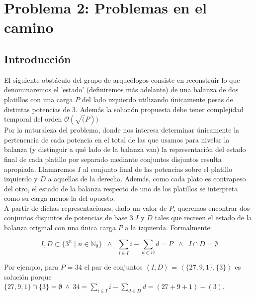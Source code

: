 \newpage
\section{Problema 2: Problemas en el camino}

\subsection{Introducción}
	El siguiente obstáculo del grupo de arqueólogos consiste en reconstruir lo que denominaremos el 'estado' (definiremos más adelante) de una balanza de dos platillos con una carga $P$ del lado izquierdo utilizando únicamente pesas de distintas potencias de 3. Además la solución propuesta debe tener complejidad temporal del orden $\mathcal{O}(\sqrt(P))$
	\\

	Por la naturaleza del problema, donde nos interesa determinar únicamente la pertenencia de cada potencia en el total de las que usamos para nivelar la balanza (y distinguir a qué lado de la balanza van) la representación del estado final de cada platillo por separado mediante conjuntos disjuntos resulta apropiada. Llamaremos $I$ al conjunto final de las potencias sobre el platillo izquierdo y $D$ a aquellas de la derecha. Además, como cada plato es contrapeso del otro, el estado de la balanza respecto de uno de los platillos se interpreta como su carga menos la del opuesto.
	\\

	A partir de dichas representaciones, dado un valor de $P$, queremos encontrar dos conjuntos disjuntos de potencias de base 3 $I$ y $D$ tales que recreen el estado de la balanza original con una única carga $P$ a la izquierda. Formalmente:

$$
    I,D \subset \{3^n \;|\; n \in \mathbb{N}_0 \} \;\; \land \;\;
    \sum_{i \in I} i - \sum_{d \in D} d = P \;\; \land \;\;
    I \cap D = \emptyset
$$

	Por ejemplo, para $P$ = 34 el par de conjuntos $\left \langle I,D  \right \rangle$ = $\left \langle \{27,9,1\},\{3\}  \right \rangle$ es solución porque \\
	$\{27,9,1\} \cap \{3\} = \emptyset \ \wedge \ 34 = \sum_{i \in I} i - \sum_{d \in D} d = (27+9+1)-(3)$.
	\\



